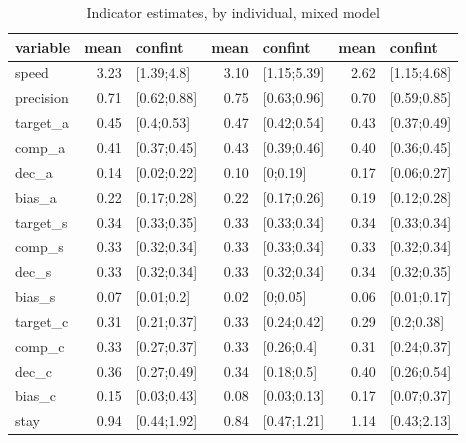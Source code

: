 \begin{table}

\caption{\label{tab:}Indicator estimates, by individual, mixed model}
\centering
\begin{tabular}[t]{lrlrlrl}
\toprule
variable & mean & confint & mean & confint & mean & confint\\
\midrule
speed & 3.23 & [1.39;4.8] & 3.10 & [1.15;5.39] & 2.62 & [1.15;4.68]\\
precision & 0.71 & [0.62;0.88] & 0.75 & [0.63;0.96] & 0.70 & [0.59;0.85]\\
target_a & 0.45 & [0.4;0.53] & 0.47 & [0.42;0.54] & 0.43 & [0.37;0.49]\\
comp_a & 0.41 & [0.37;0.45] & 0.43 & [0.39;0.46] & 0.40 & [0.36;0.45]\\
dec_a & 0.14 & [0.02;0.22] & 0.10 & [0;0.19] & 0.17 & [0.06;0.27]\\
\addlinespace
bias_a & 0.22 & [0.17;0.28] & 0.22 & [0.17;0.26] & 0.19 & [0.12;0.28]\\
target_s & 0.34 & [0.33;0.35] & 0.33 & [0.33;0.34] & 0.34 & [0.33;0.34]\\
comp_s & 0.33 & [0.32;0.34] & 0.33 & [0.33;0.34] & 0.33 & [0.32;0.34]\\
dec_s & 0.33 & [0.32;0.34] & 0.33 & [0.32;0.34] & 0.34 & [0.32;0.35]\\
bias_s & 0.07 & [0.01;0.2] & 0.02 & [0;0.05] & 0.06 & [0.01;0.17]\\
\addlinespace
target_c & 0.31 & [0.21;0.37] & 0.33 & [0.24;0.42] & 0.29 & [0.2;0.38]\\
comp_c & 0.33 & [0.27;0.37] & 0.33 & [0.26;0.4] & 0.31 & [0.24;0.37]\\
dec_c & 0.36 & [0.27;0.49] & 0.34 & [0.18;0.5] & 0.40 & [0.26;0.54]\\
bias_c & 0.15 & [0.03;0.43] & 0.08 & [0.03;0.13] & 0.17 & [0.07;0.37]\\
stay & 0.94 & [0.44;1.92] & 0.84 & [0.47;1.21] & 1.14 & [0.43;2.13]\\
\bottomrule
\end{tabular}
\end{table}
